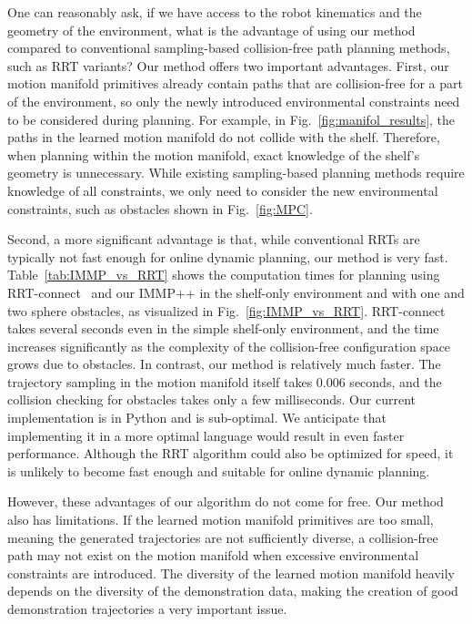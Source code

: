 One can reasonably ask, if we have access to the robot kinematics and the geometry of the environment, what is the advantage of using our method compared to conventional sampling-based collision-free path planning methods, such as RRT variants? Our method offers two important advantages. First, our motion manifold primitives already contain paths that are collision-free for a part of the environment, so only the newly introduced environmental constraints need to be considered during planning. For example, in Fig.~\ref{fig:manifol_results}, the paths in the learned motion manifold do not collide with the shelf. Therefore, when planning within the motion manifold, exact knowledge of the shelf's geometry is unnecessary. While existing sampling-based planning methods require knowledge of all constraints, we only need to consider the new environmental constraints, such as obstacles shown in Fig.~\ref{fig:MPC}.

Second, a more significant advantage is that, while conventional RRTs are typically not fast enough for online dynamic planning, our method is very fast. Table~\ref{tab:IMMP_vs_RRT} shows the computation times for planning using RRT-connect~\cite{kuffner2000rrt} and our IMMP++ in the shelf-only environment and with one and two sphere obstacles, as visualized in Fig.~\ref{fig:IMMP_vs_RRT}. RRT-connect takes several seconds even in the simple shelf-only environment, and the time increases significantly as the complexity of the collision-free configuration space grows due to obstacles. In contrast, our method is relatively much faster. The trajectory sampling in the motion manifold itself takes 0.006 seconds, and the collision checking for obstacles takes only a few milliseconds. Our current implementation is in Python and is sub-optimal. We anticipate that implementing it in a more optimal language would result in even faster performance. Although the RRT algorithm could also be optimized for speed, it is unlikely to become fast enough and suitable for online dynamic planning.

However, these advantages of our algorithm do not come for free. Our method also has limitations. If the learned motion manifold primitives are too small, meaning the generated trajectories are not sufficiently diverse, a collision-free path may not exist on the motion manifold when excessive environmental constraints are introduced. The diversity of the learned motion manifold heavily depends on the diversity of the demonstration data, making the creation of good demonstration trajectories a very important issue.


